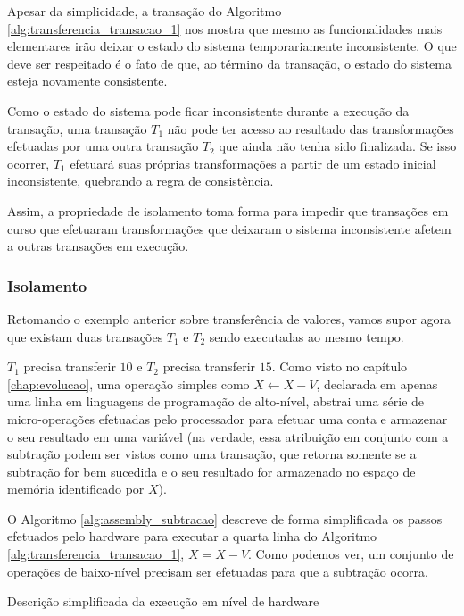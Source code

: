 \documentclass[11pt,twoside,a4paper]{book}
\begin{document}
Apesar da simplicidade, a transação do Algoritmo \ref{alg:transferencia_transacao_1} nos mostra que mesmo as funcionalidades mais elementares irão deixar o estado do sistema temporariamente inconsistente. O que deve ser respeitado é o fato de que, ao término da transação, o estado do sistema esteja novamente consistente.

Como o estado do sistema pode ficar inconsistente durante a execução da transação, uma transação $T_1$ não pode ter acesso ao resultado das transformações efetuadas por uma outra transação $T_2$ que ainda não tenha sido finalizada. Se isso ocorrer, $T_1$ efetuará  suas próprias transformações a partir de um estado inicial inconsistente, quebrando a regra de consistência.

Assim, a propriedade de isolamento toma forma para impedir que transações em curso que efetuaram transformações que deixaram o sistema inconsistente afetem a outras transações em execução. 

\subsubsection*{Isolamento}
Retomando o exemplo anterior sobre transferência de valores, vamos supor agora que existam duas transações $T_1$ e $T_2$ sendo executadas ao mesmo tempo.

$T_1$ precisa transferir $10$ e $T_2$ precisa transferir $15$. Como visto no capítulo \ref{chap:evolucao}, uma operação simples como $X \gets X - V$, declarada em apenas uma linha em linguagens de programação de alto-nível, abstrai uma série de micro-operações efetuadas pelo processador para efetuar uma conta e armazenar o seu resultado em uma variável (na verdade, essa atribuição em conjunto com a subtração podem ser vistos como uma transação, que retorna somente se a subtração for bem sucedida e o seu resultado for armazenado no espaço de memória identificado por $X$). 

O Algoritmo \ref{alg:assembly_subtracao} descreve de forma simplificada os passos efetuados pelo hardware para executar a quarta linha do Algoritmo \ref{alg:transferencia_transacao_1}, $X = X - V$. Como podemos ver, um conjunto de operações de baixo-nível precisam ser efetuadas para que a subtração ocorra.

\begin{algorithm}
\caption{Descrição simplificada da execução em nível de hardware}
\label{alg:assembly_subtracao}
\end{algorithm}
\end{document}
